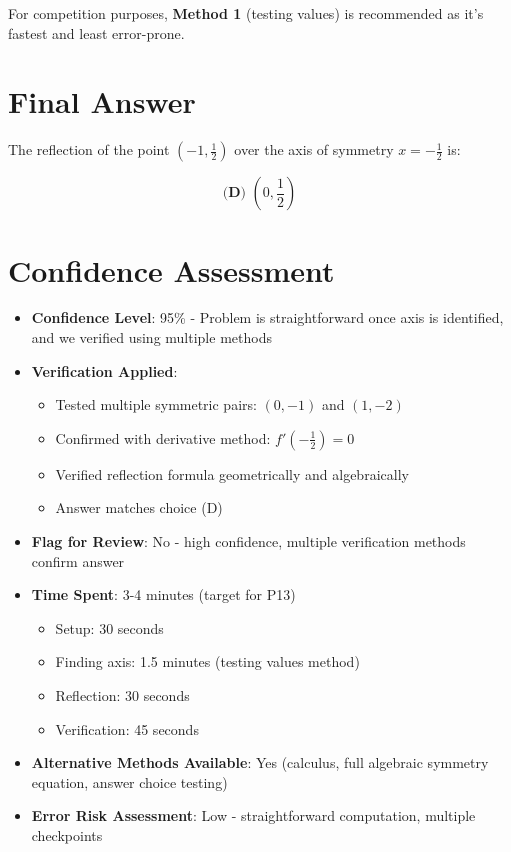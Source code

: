 \documentclass[12pt]{article}
\begin{document}
For competition purposes, \textbf{Method 1} (testing values) is recommended as it's fastest and least error-prone.

\section*{Final Answer}

The reflection of the point $\left(-1, \frac{1}{2}\right)$ over the axis of symmetry $x = -\frac{1}{2}$ is:

$$\boxed{\textbf{(D) } \left(0, \frac{1}{2}\right)}$$

\section*{Confidence Assessment}

\begin{itemize}[leftmargin=*]
    \item \textbf{Confidence Level}: 95\% - Problem is straightforward once axis is identified, and we verified using multiple methods
    
    \item \textbf{Verification Applied}: 
    \begin{itemize}
        \item Tested multiple symmetric pairs: $(0, -1)$ and $(1, -2)$
        \item Confirmed with derivative method: $f'(-\frac{1}{2}) = 0$
        \item Verified reflection formula geometrically and algebraically
        \item Answer matches choice (D)
    \end{itemize}
    
    \item \textbf{Flag for Review}: No - high confidence, multiple verification methods confirm answer
    
    \item \textbf{Time Spent}: 3-4 minutes (target for P13)
    \begin{itemize}
        \item Setup: 30 seconds
        \item Finding axis: 1.5 minutes (testing values method)
        \item Reflection: 30 seconds
        \item Verification: 45 seconds
    \end{itemize}
    
    \item \textbf{Alternative Methods Available}: Yes (calculus, full algebraic symmetry equation, answer choice testing)
    
    \item \textbf{Error Risk Assessment}: Low - straightforward computation, multiple checkpoints
\end{itemize}
\end{document}
